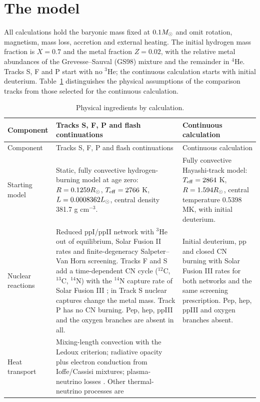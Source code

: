 \section{The model}\label{sec:model}
All calculations hold the baryonic mass fixed at $0.1M_\odot$ and omit rotation,
magnetism, mass loss, accretion and external heating. The initial hydrogen
mass fraction is $X=0.7$ and the metal fraction $Z=0.02$, with the relative
metal abundances of the Grevesse--Sauval (GS98) mixture and the remainder in
$^4$He. Tracks S, F and P start with no $^3$He; the continuous calculation
starts with initial deuterium. Table~\ref{tab:ingredients} distinguishes
the physical assumptions of the comparison tracks from those selected for
the continuous calculation.

{\small\renewcommand{\arraystretch}{1.12}
\begin{longtable}{@{}>{\raggedright\arraybackslash}p{}>{\raggedright\arraybackslash}p{}>{\raggedright\arraybackslash}p{}@{}}
\caption{Physical ingredients by calculation.}\label{tab:ingredients}\\
\toprule Component & Tracks S, F, P and flash continuations & Continuous calculation \\\midrule\endfirsthead
\toprule Component & Tracks S, F, P and flash continuations & Continuous calculation \\\midrule\endhead
Starting model & Static, fully convective hydrogen-burning model at age zero:
$R=0.1259R_\odot$, $T_{\rm eff}=2766$ K, $L=0.0008362L_\odot$, central density
381.7 g cm$^{-3}$. & Fully convective Hayashi-track model: $T_{\rm eff}=2864$ K,
$R=1.594R_\odot$, central temperature 0.5398 MK, with initial deuterium. \\[4pt]
Nuclear reactions & Reduced ppI/ppII network with $^3$He out of equilibrium,
Solar Fusion II rates \cite{adelberger11} and finite-degeneracy Salpeter--Van
Horn screening. Tracks F and S add a time-dependent CN cycle ($^{12}$C,
$^{13}$C, $^{14}$N) with the $^{14}$N capture rate of Solar Fusion III
\cite{acharya25}; in Track S nuclear captures change the metal mass. Track P
has no CN burning. Pep, hep, ppIII and the oxygen branches are absent in all.
& Initial deuterium, pp and closed CN burning with Solar Fusion III rates
for both networks and the same screening prescription.
Pep, hep, ppIII and oxygen branches absent. \\[4pt]
Heat transport & Mixing-length convection with the Ledoux criterion;
radiative opacity plus electron conduction from Ioffe/Cassisi mixtures;
plasma-neutrino losses \cite{hrw94}. Other thermal-neutrino processes are

\end{longtable}}
